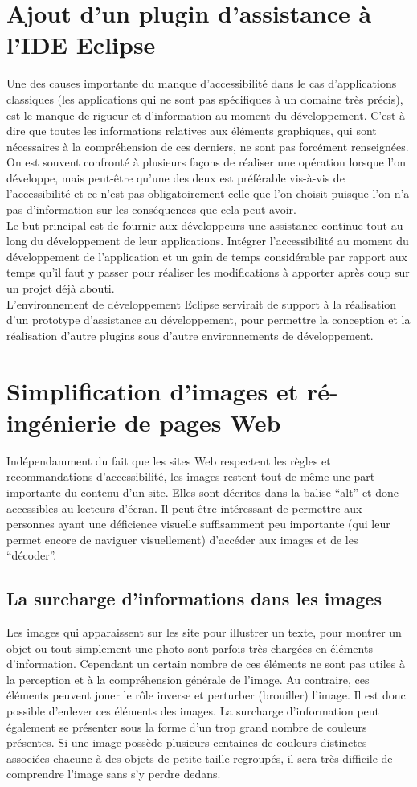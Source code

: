 \documentclass[french,a4paper]{report}
\begin{document}
{\section{Ajout d'un plugin d'assistance à l'IDE Eclipse}
Une des causes importante du manque d'accessibilité dans le cas d'applications classiques (les
applications qui ne sont pas spécifiques à un domaine très précis), est le manque de rigueur et
d'information au moment du développement. C'est-à-dire que toutes les informations relatives aux
éléments graphiques, qui sont nécessaires à la compréhension de ces derniers, ne sont pas forcément
renseignées. On est souvent confronté à plusieurs façons de réaliser une opération lorsque l'on
développe, mais peut-être qu'une des deux est préférable vis-à-vis de l'accessibilité et ce n'est
pas obligatoirement celle que l'on choisit puisque l'on n'a pas d'information sur les conséquences
que cela peut avoir.\\
Le but principal est de fournir aux développeurs une assistance continue tout au long du
développement de leur applications. Intégrer l'accessibilité au moment du développement de
l'application et un gain de temps considérable par rapport aux temps qu'il faut y passer pour
réaliser les modifications à apporter après coup sur un projet déjà abouti.\\
L'environnement de développement Eclipse servirait de support à la réalisation d'un prototype
d'assistance au développement, pour permettre la conception et la réalisation d'autre plugins sous
d'autre environnements de développement.
\section{Simplification d'images et ré-ingénierie de pages Web}
Indépendamment du fait que les sites Web respectent les règles et
recommandations d'accessibilité, les images restent tout de même une part
importante du contenu d'un site. Elles sont décrites dans la balise \enquote{alt} et
donc accessibles au lecteurs d'écran. Il peut être intéressant de permettre aux
personnes ayant une déficience visuelle suffisamment peu importante (qui leur permet encore de naviguer visuellement) d'accéder aux images et de les \enquote{décoder}.
\subsection{La surcharge d'informations dans les images}
Les images qui apparaissent sur les site pour illustrer un texte, pour montrer
un objet ou tout simplement une photo sont parfois très chargées en éléments
d'information. Cependant un certain nombre de ces éléments ne sont pas utiles à
la perception et à la compréhension générale de l'image. Au contraire, ces
éléments peuvent jouer le rôle inverse et perturber (brouiller) l'image. Il est
donc possible d'enlever ces éléments des images.
\newline
La surcharge d'information peut également se présenter sous la forme d'un trop grand nombre de couleurs présentes. Si une image possède plusieurs centaines de couleurs distinctes associées chacune à des objets de petite taille regroupés, il sera très difficile de comprendre l'image sans s'y perdre dedans.
}
\end{document}
